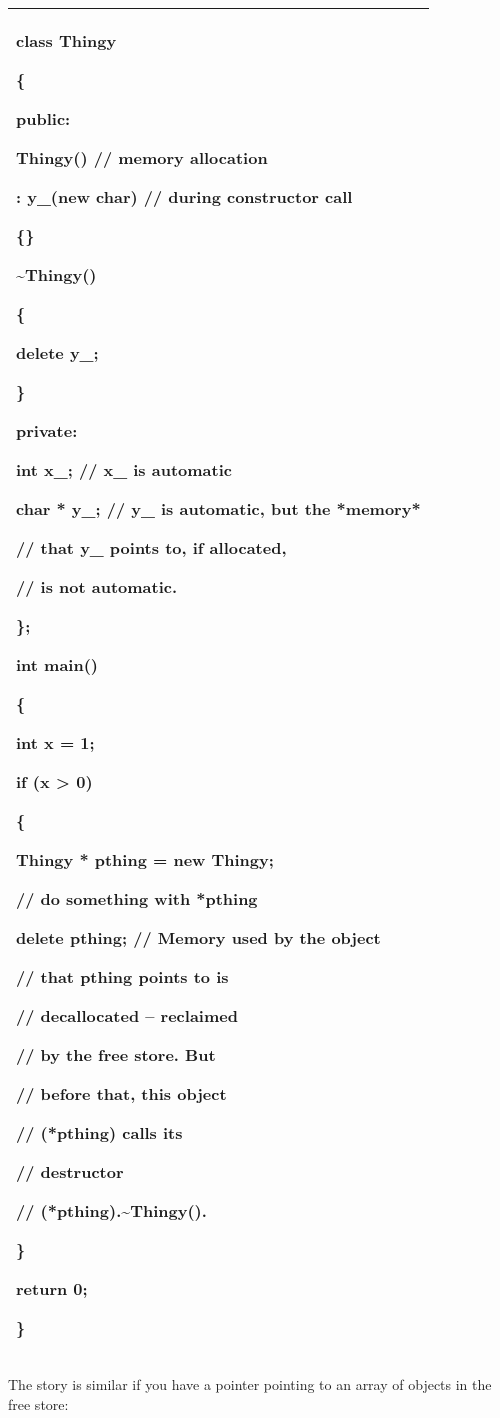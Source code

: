 \documentclass[
]{article}
\begin{document}
\begin{longtable}[]{@{}l@{}}
\toprule
\endhead
\begin{minipage}[t]{0.97\columnwidth}\raggedright
class Thingy

\{

public:

Thingy() // memory allocation

: y\_(new char) // during constructor call

\{\}

\textasciitilde Thingy()

\{

delete y\_;

\}

private:

int x\_; // x\_ is automatic

char * y\_; // y\_ is automatic, but the *memory*

// that y\_ points to, if allocated,

// is not automatic.

\};

int main()

\{

int x = 1;

if (x \textgreater{} 0)

\{

Thingy * pthing = new Thingy;

// do something with *pthing

delete pthing; // Memory used by the object

// that pthing points to is

// decallocated -- reclaimed

// by the free store. But

// before that, this object

// (*pthing) calls its

// destructor

// (*pthing).\textasciitilde Thingy().

\}

return 0;

\}\strut
\end{minipage}\tabularnewline
\bottomrule
\end{longtable}

The story is similar if you have a pointer pointing to an array of
objects in the free store:
\end{document}
